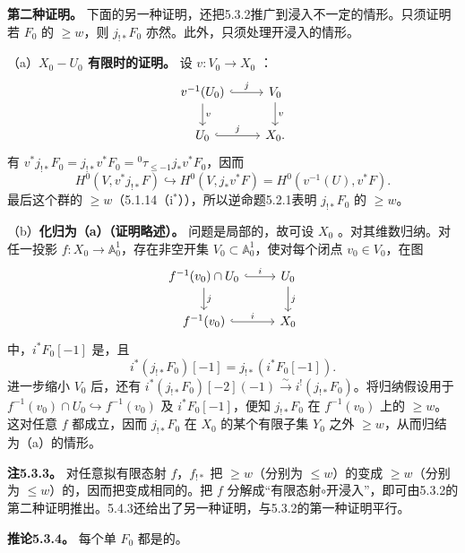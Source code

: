\par\noindent\textbf{第二种证明。} 下面的另一种证明，还把5.3.2推广到浸入不一定的情形。只须证明若 $F_0$ 的 $\ge w$，则 $j_{!*}F_0$ 亦然。此外，只须处理开浸入的情形。

（a）\textbf{$X_0-U_0$ 有限时的证明。} 设 $v:V_0\to X_0$ ：
\[
\begin{tikzcd}[ampersand replacement=\&]
v^{-1}(U_0)\arrow[r,hook,"{j}"]\arrow[d,"{v}"]\&V_0\arrow[d,"{v}"]\\
U_0\arrow[r,hook,"{j}"]\&X_0.
\end{tikzcd}
\]
有 $v^*j_{!*}F_0=j_{!*}v^*F_0={}^0\tau_{\le-1}j_*v^*F_0$，因而
\[
H^0(V,v^*j_{!*}F)\hookrightarrow H^0(V,j_*v^*F)=H^0(v^{-1}(U),v^*F).
\]
最后这个群的 $\ge w$（5.1.14（i${}^*$）），所以逆命题5.2.1表明 $j_{!*}F_0$ 的 $\ge w$。

（b）\textbf{化归为（a）（证明略述）。} 问题是局部的，故可设 $X_0$ 。对其维数归纳。对任一投影 $f:X_0\to\mathbb A_0^1$，存在非空开集 $V_0\subset\mathbb A_0^1$，使对每个闭点 $v_0\in V_0$，在图
\[
\begin{tikzcd}[ampersand replacement=\&]
f^{-1}(v_0)\cap U_0\arrow[r,hook,"{i}"]\arrow[d,"{j}"]\&U_0\arrow[d,"{j}"]\\
f^{-1}(v_0)\arrow[r,hook,"{i}"]\&X_0
\end{tikzcd}
\]
中，$i^*F_0[-1]$ 是，且
\[
i^*(j_{!*}F_0)[-1]=j_{!*}(i^*F_0[-1]).
\]
进一步缩小 $V_0$ 后，还有 $i^*(j_{!*}F_0)[-2](-1)\xrightarrow{\sim}i^!(j_{!*}F_0)$。将归纳假设用于 $f^{-1}(v_0)\cap U_0\hookrightarrow f^{-1}(v_0)$ 及 $i^*F_0[-1]$，便知 $j_{!*}F_0$ 在 $f^{-1}(v_0)$ 上的 $\ge w$。这对任意 $f$ 都成立，因而 $j_{!*}F_0$ 在 $X_0$ 的某个有限子集 $Y_0$ 之外 $\ge w$，从而归结为（a）的情形。

\par\medskip\noindent\textbf{注5.3.3。} 对任意拟有限态射 $f$，$f_{!*}$ 把 $\ge w$（分别为 $\le w$）的变成 $\ge w$（分别为 $\le w$）的，因而把变成相同的。把 $f$ 分解成“有限态射$\circ$开浸入”，即可由5.3.2的第二种证明推出。5.4.3还给出了另一种证明，与5.3.2的第一种证明平行。

\par\medskip\noindent\textbf{推论5.3.4。} 每个单 $F_0$ 都是的。

